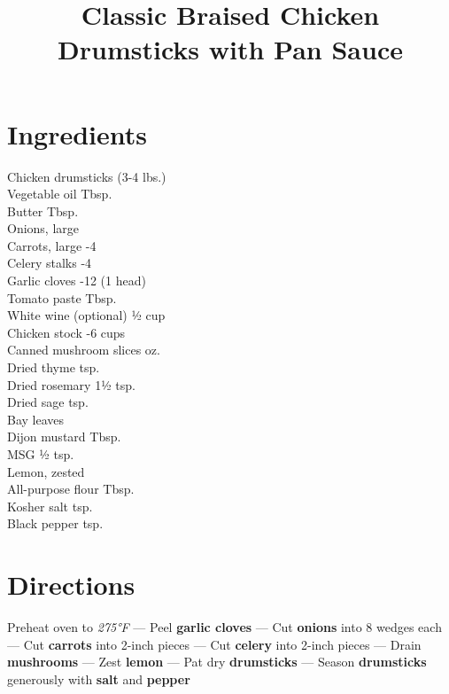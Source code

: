 \documentclass[11pt,letterpaper]{article}
\title{Classic Braised Chicken Drumsticks with Pan Sauce}
\author{}
\date{}
\begin{document}
\maketitle
\thispagestyle{empty}

\section*{Ingredients}
\setlength{\columnsep}{20pt}
\begin{multicols}{2}
\noindent
    Chicken drumsticks  (3-4 lbs.) \\
    Vegetable oil  Tbsp. \\
    Butter  Tbsp. \\
    Onions, large  \\
    Carrots, large -4 \\
    Celery stalks -4 \\
    Garlic cloves -12 (1 head) \\
    Tomato paste  Tbsp. \\
    White wine (optional) \dotfill ½ cup \\
    \columnbreak
    Chicken stock -6 cups \\
    Canned mushroom slices  oz. \\
    Dried thyme  tsp. \\
    Dried rosemary \dotfill 1½ tsp. \\
    Dried sage  tsp. \\
    Bay leaves  \\
    Dijon mustard  Tbsp. \\
    MSG \dotfill ½ tsp. \\
    Lemon, zested  \\
    All-purpose flour  Tbsp. \\
    Kosher salt  tsp. \\
    Black pepper  tsp. \\
\end{multicols}

\section*{Directions}

\noindent
Preheat oven to \textit{275°F} ---
Peel \textbf{garlic cloves} ---
Cut \textbf{onions} into 8 wedges each ---
Cut \textbf{carrots} into 2-inch pieces ---
Cut \textbf{celery} into 2-inch pieces ---
Drain \textbf{mushrooms} ---
Zest \textbf{lemon} ---
Pat dry \textbf{drumsticks} ---
Season \textbf{drumsticks} generously with \textbf{salt} and \textbf{pepper}
\end{document}
